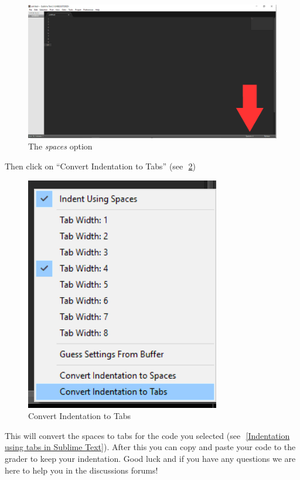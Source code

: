 \documentclass{article}
\newenvironment{answer}{}{}
\newenvironment{faq}{\begin{description}}{\end{description}}
\begin{document}
\begin{faq}
\begin{answer}
			\begin{figure}[htb]
				\centering
				\caption{The \emph{spaces} option} \label{The spaces option}
				\includegraphics[scale=.25]{spaces_option}
			\end{figure}
			
			Then click on ``Convert Indentation to Tabs'' (see~\figurename\,\textcolor{blue}{\ref{Convert Indentation to Tabs}})
			
			\begin{figure}[htb]
				\centering
				\caption{Convert Indentation to Tabs} \label{Convert Indentation to Tabs}
				\includegraphics[scale=.5]{indentation_to_tabs}
			\end{figure}
			
			This will convert the spaces to tabs for the code you selected (see~\figurename\,\textcolor{blue}{\ref{Indentation using tabs in Sublime Text}}). After this you can copy and paste your code to the grader to keep your indentation. Good luck and
			if you have any questions we are here to help you in the discussions forums!
			

\end{answer}
\end{faq}
\end{document}
